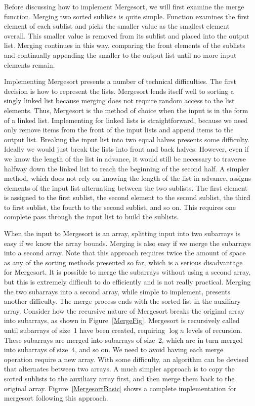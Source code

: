Before discussing how to implement Mergesort, we will first examine
the merge function.
Merging two sorted sublists is quite simple.
Function  examines the first element of each
sublist and picks the smaller value as the smallest element overall.
This smaller value is removed from its sublist and placed into the
output list.
Merging continues in this way, comparing the front
elements of the sublists and continually appending the smaller to the
output list until no more input elements remain.

Implementing Mergesort presents a number of technical difficulties.
The first decision is how to represent the lists.
Mergesort lends itself well to sorting a singly linked list because
merging does not require random access to the list elements.
Thus, Mergesort is the method of choice when the input is in the form
of a linked list.
Implementing  for linked lists is straightforward, because
we need only remove items from the front of the input lists and append
items to the output list.
Breaking the input list into two equal halves presents some
difficulty.
Ideally we would just break the lists into front and back halves.
However, even if we know the length of the list in advance, it would
still be necessary to traverse halfway down the linked list to reach
the beginning of the second half.
A simpler method, which does not rely on knowing the length of the
list in advance, assigns elements of the input list alternating
between the two sublists.
The first element is assigned to the first sublist, the
second element to the second sublist, the third to first sublist, the
fourth to the second sublist, and so on.
This requires one complete pass through the input list to build the
sublists.

When the input to Mergesort is an array, splitting input into two
subarrays is easy if we know the array bounds.
Merging is also easy if we merge the subarrays into a second array.
Note that this approach requires twice the amount of space as any of
the sorting methods presented so far, which is a serious disadvantage
for Mergesort.
It is possible to merge the subarrays without using a second array,
but this is extremely difficult to do efficiently and is
not really practical.
Merging the two subarrays into a second array, while
simple to implement, presents another difficulty.
The merge process ends with the sorted list in the auxiliary array.
Consider how the recursive nature of Mergesort breaks
the original array into subarrays, as shown in Figure~\ref{MergeFig}.
Mergesort is recursively called until subarrays of size~1 have been
created, requiring \(\log n\) levels of recursion.
These subarrays are merged into subarrays of size~2, which are in
turn merged into subarrays of size~4, and so on.
We need to avoid having each merge operation
require a new array.
With some difficulty, an algorithm can be
devised that alternates between two arrays.  A much simpler approach
is to copy the sorted sublists to the auxiliary array first, and then
merge them back to the original array.
Figure~\ref{MergesortBasic} shows a complete implementation for
mergesort following this approach.

